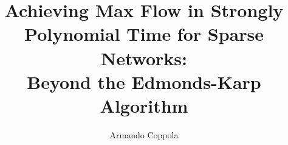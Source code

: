 \documentclass[binding=0.6cm, noexaminfo]{sapthesis}
\title{Achieving Max Flow in Strongly Polynomial Time for Sparse Networks:\\Beyond the Edmonds-Karp Algorithm}
\author{Armando Coppola}
\theoremstyle{definition}
\begin{document}
\lstset{language=Python}

\frontmatter

\maketitle

\dedication{
  Non so manco se è tanto o poco\\
  Ma questa cosa mi fa felice\\
  E se faccio quello che faccio\\
  Non devo dire grazie a nessuno\\
  Soprattutto se faccio quello che amo\\
  Non devo dire grazie a nessuno\\
  Se non a me stesso\\
  Per cui grazie Giò, grazie\\
}

% 

\cleardoublepage

\tableofcontents
\let\cleardoublepage\clearpage

\hypersetup{colorlinks=true, linkcolor=blue, citecolor=red}


\mainmatter







% 





\backmatter
{}

% 
% 
\printbibliography
\end{document}
